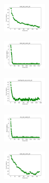 \begin{figure}[H]
    \begin{subfigure}
        \centering
        \includegraphics[width=0.234\textwidth]{img/am10/ecoli_set_const_20_589741062_cost.png}
    \end{subfigure}
    \hfill
    \begin{subfigure}
        \centering
        \includegraphics[width=0.234\textwidth]{img/am10/rand_set_const_20_589741062_cost.png}
    \end{subfigure}
    \hfill
    \begin{subfigure}
        \centering
        \includegraphics[width=0.234\textwidth]{img/am10/newthyroid_set_const_20_589741062_cost.png}
    \end{subfigure}
    \hfill
    \begin{subfigure}
        \centering
        \includegraphics[width=0.234\textwidth]{img/am10/iris_set_const_20_277451237_cost.png}
    \end{subfigure}
    \hfill
    \begin{subfigure}
        \centering
        \includegraphics[width=0.234\textwidth]{img/am10/ecoli_set_const_20_277451237_cost.png}
    \end{subfigure}
    \hfill
    \begin{subfigure}
        \centering

\end{subfigure}
\end{figure}
